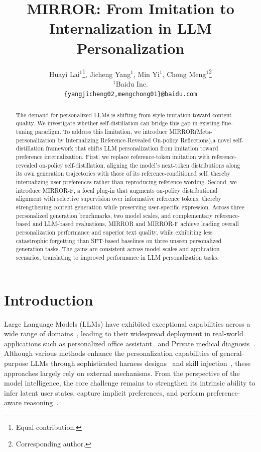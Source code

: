\documentclass{article} %
\title{MIRROR: From Imitation to Internalization in LLM Personalization}
\author{
Huayi Lai$^{1}$\thanks{Equal contribution.},
Jicheng Yang$^{1}$\footnotemark[1],
Min Yi$^{1}$,
Chong Meng$^{1}$\thanks{Corresponding author.}\\
$^{1}$Baidu Inc.\\
\texttt{\{yangjicheng02,mengchong01\}@baidu.com}
}
\begin{document}
\maketitle

\begin{abstract}
The demand for personalized LLMs is shifting from style imitation toward content quality. We investigate whether self-distillation can bridge this gap in existing fine-tuning paradigm. 
To address this limitation, we introduce MIRROR(Meta-
personalization by Internalizing Reference-Revealed On-policy Reflections),a novel self-distillation framework that shifts LLM personalization from imitation toward preference internalization. 
First, we replace reference-token imitation with reference-revealed on-policy self-distillation, aligning the model’s next-token distributions along its own generation trajectories with those of its reference-conditioned self, thereby internalizing user preferences rather than reproducing reference wording.
Second, we introduce MIRROR-F, a focal plug-in that augments on-policy distributional alignment with selective supervision over informative reference tokens, thereby strengthening content generation while preserving user-specific expression.
Across three personalized generation benchmarks, two model scales, and complementary reference-based and LLM-based evaluations, MIRROR and MIRROR-F achieve leading overall personalization performance and superior text quality, while exhibiting less catastrophic forgetting than SFT-based baselines on three unseen personalized generation tasks.
The gains are consistent across model scales and application scenarios, translating to improved performance in LLM personalization tasks. 
\end{abstract}

\section{Introduction}
\label{Introduction}
Large Language Models (LLMs) have exhibited exceptional capabilities across a wide range of domains~\citep{kimik3,qwen3}, leading to their widespread deployment in real-world applications such as personalized office assistant~\citep{office1,office2} and Private medical diagnosis~\citep{hospital}.
Although various methods enhance the personalization capabilities of general-purpose LLMs through sophisticated harness designs~\citep{harness} and skill injection~\citep{skill}, these approaches largely rely on external mechanisms. From the perspective of the model intelligence, the core challenge remains to strengthen its intrinsic ability to infer latent user states, capture implicit preferences, and perform preference-aware reasoning~\citep{antiharness,antiharness2,antiharness3}.
\end{document}
